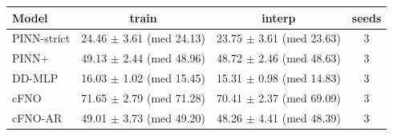 \begin{tabular}{lccc}
\toprule
Model & train & interp & seeds \\
\midrule
PINN-strict & 24.46 $\pm$ 3.61 (med 24.13) & 23.75 $\pm$ 3.61 (med 23.63) & 3 \\
PINN+ & 49.13 $\pm$ 2.44 (med 48.96) & 48.72 $\pm$ 2.46 (med 48.63) & 3 \\
DD-MLP & 16.03 $\pm$ 1.02 (med 15.45) & 15.31 $\pm$ 0.98 (med 14.83) & 3 \\
cFNO & 71.65 $\pm$ 2.79 (med 71.28) & 70.41 $\pm$ 2.37 (med 69.09) & 3 \\
cFNO-AR & 49.01 $\pm$ 3.73 (med 49.20) & 48.26 $\pm$ 4.41 (med 48.39) & 3 \\
\bottomrule
\end{tabular}
